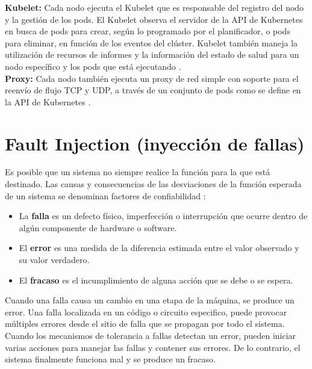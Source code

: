 \textbf{Kubelet:} Cada nodo ejecuta el Kubelet que es responsable del registro del nodo y la gestión de los pods. El Kubelet observa el servidor de la API de Kubernetes en busca de pods para crear, según lo programado por el planificador, o pods para eliminar, en función de los eventos del clúster. Kubelet también maneja la utilización de recursos de informes y la información del estado de salud para un nodo específico y los pods que está ejecutando \cite{BOOK04}.\\

\textbf{Proxy:} Cada nodo también ejecuta un proxy de red simple con soporte para el reenvío de flujo TCP y UDP, a través de un conjunto de pods como se define en la API de Kubernetes \cite{BOOK04}.\\




\section{Fault Injection (inyección de fallas)}

\par Es posible que un sistema no siempre realice la función para la que está destinado. Las causas y consecuencias de las desviaciones de la función esperada de un sistema se denominan factores de confiabilidad \cite{LIB05}:
\begin{itemize}
    \item La \textbf{falla} es un defecto físico, imperfección o interrupción que ocurre dentro de algún componente de hardware o software.
    \item El \textbf{error} es una medida de la diferencia estimada entre el valor observado y su valor verdadero.
    \item El \textbf{fracaso} es el incumplimiento de alguna acción que se debe o se espera.
\end{itemize}


\par Cuando una falla causa un cambio en una etapa de la máquina, se produce un error. Una falla localizada en un código o circuito especifico, puede provocar múltiples errores desde el sitio de falla que se propagan por todo el sistema. Cuando los mecanismos de tolerancia a fallas detectan un error, pueden iniciar varias acciones para manejar las fallas y contener sus errores. De lo contrario, el sistema finalmente funciona mal y se produce un fracaso.\\

